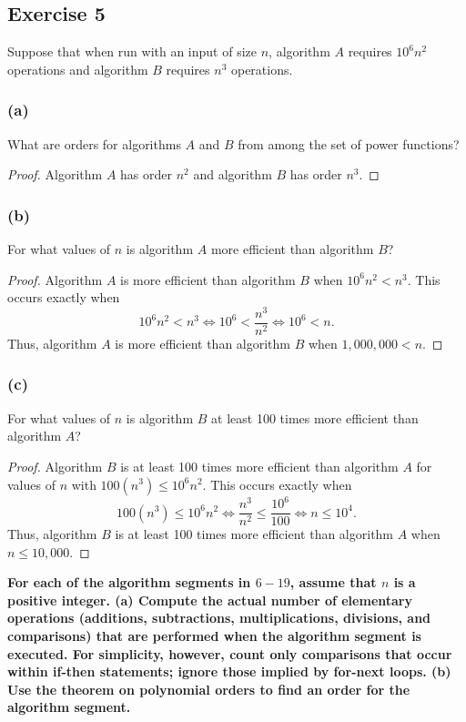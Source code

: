 \documentclass[14pt]{extarticle}
\newcommand{\cy}{\color{cyan}}
\begin{document}
\subsection{Exercise 5}
Suppose that when run with an input of size \(n\), algorithm \(A\) requires \(10^6 n^2\) operations and algorithm \(B\) 
requires \(n^3\) operations.

\subsubsection{(a)}
What are orders for algorithms \(A\) and \(B\) from among the set of power functions?

\begin{proof}
Algorithm \(A\) has order \(n^2\) and algorithm \(B\) has order \(n^{3}\).
\end{proof}

\subsubsection{(b)}
For what values of \(n\) is algorithm \(A\) more efficient than algorithm \(B\)?

\begin{proof}
Algorithm \(A\) is more efficient than algorithm \(B\) when \(10^6 n^2 < n^3\). This occurs exactly when
\[
10^6 n^2 < n^3 \iff 10^6 < \frac{n^3}{n^2} \iff 10^6 < n.
\]
Thus, algorithm \(A\) is more efficient than algorithm \(B\) when \(1,000,000 < n\).
\end{proof}

\subsubsection{(c)}
For what values of \(n\) is algorithm \(B\) at least 100 times more efficient than algorithm \(A\)?

\begin{proof}
Algorithm \(B\) is at least 100 times more efficient than algorithm \(A\) for values of \(n\) with \(100(n^3) \leq 
10^6 n^2\). This occurs exactly when 
\[
100(n^3) \leq 10^6 n^2 \iff \frac{n^3}{n^2} \leq \frac{10^6}{100} \iff n \leq 10^4. 
\]
Thus, algorithm \(B\) is at least 100 times more efficient than algorithm \(A\) when \(n \leq 10,000\).
\end{proof}

{\bf \cy For each of the algorithm segments in \(6-19\), assume that \(n\) is a positive integer. (a) Compute the 
actual number of elementary operations (additions, subtractions, multiplications, divisions, and comparisons) 
that are performed when the algorithm segment is executed. For simplicity, however, count only comparisons that occur within 
if-then statements; ignore those implied by for-next loops. (b) Use the theorem on polynomial orders to find an order for 
the algorithm segment.}
\end{document}
